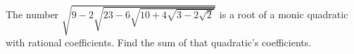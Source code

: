 The number $\sqrt{9-2\sqrt{23-6\sqrt{10+4\sqrt{3-2\sqrt2}}}}$ is a root of a monic quadratic with rational coefficients. Find the sum of that quadratic's coefficients.
